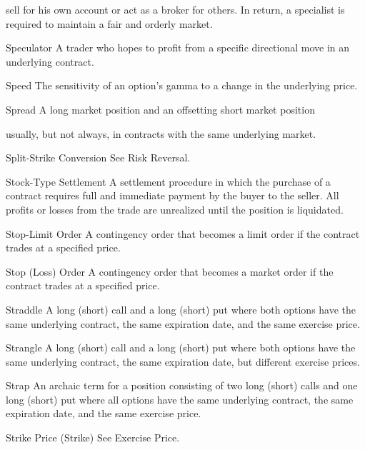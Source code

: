 sell for his own account or act as a broker for others. In return, a specialist is required to maintain a fair and orderly market.\par
Speculator A trader who hopes to profit from a specific directional move in an underlying contract.\par
Speed The sensitivity of an option's gamma to a change in the underlying price.\par
Spread A long market position and an offsetting short market position\par
usually, but not always, in contracts with the same underlying market.\par
Split-Strike Conversion See Risk Reversal.\par
Stock-Type Settlement A settlement procedure in which the purchase of a contract requires full and immediate payment by the buyer to the seller. All profits or losses from the trade are unrealized until the position is liquidated.\par
Stop-Limit Order A contingency order that becomes a limit order if the contract trades at a specified price.\par
Stop (Loss) Order A contingency order that becomes a market order if the contract trades at a specified price.\par
Straddle A long (short) call and a long (short) put where both options have the same underlying contract, the same expiration date, and the same exercise price.\par
Strangle A long (short) call and a long (short) put where both options have the same underlying contract, the same expiration date, but different exercise prices.\par
Strap An archaic term for a position consisting of two long (short) calls and one long (short) put where all options have the same underlying contract, the same expiration date, and the same exercise price.\par
Strike Price (Strike) See Exercise Price.\par

